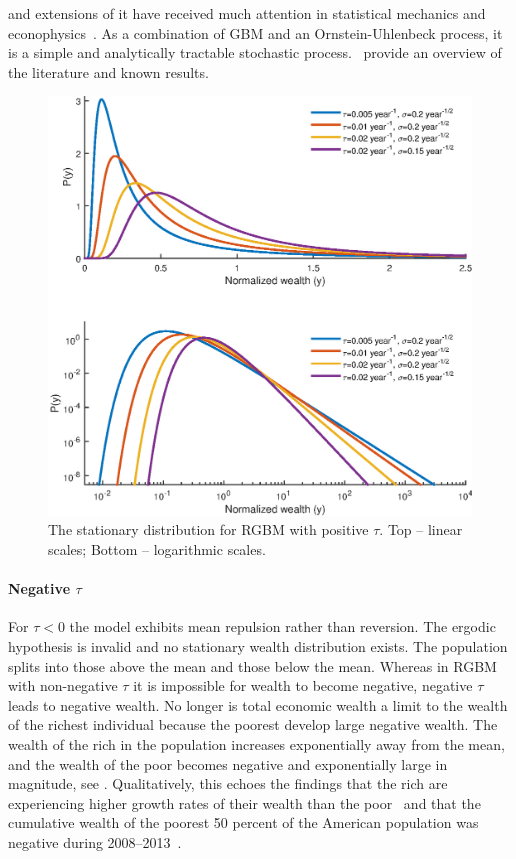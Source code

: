  and extensions of it have received much attention in statistical mechanics and econophysics~\cite{BouchaudMezard2000,Bouchaud2015}. As a combination of GBM and an Ornstein-Uhlenbeck process, it is a simple and analytically tractable stochastic process.~\cite{LiuSerota2016} provide an overview of the literature and known results.

\begin{figure}[!htb]
\centering
\includegraphics[width=1.0\textwidth] {./chapter_3/figs/dists.eps}
\caption{The stationary distribution for RGBM with positive $\tau$. Top -- linear scales; Bottom -- logarithmic scales.}
\end{figure}

\paragraph{Negative $\tau$}

For $\tau<0$ the model exhibits mean repulsion rather than reversion. The ergodic hypothesis is invalid and no stationary wealth distribution exists. The population splits into those above the mean and those below the mean. Whereas in RGBM with non-negative $\tau$ it is impossible for wealth to become negative, negative $\tau$ leads to negative wealth. No longer is total economic wealth a limit to the wealth of the richest individual because the poorest develop large negative wealth. The wealth of the rich in the population increases exponentially away from the mean, and the wealth of the poor becomes negative and exponentially large in magnitude, see . Qualitatively, this echoes the findings that the rich are experiencing higher growth rates of their wealth than the poor~\cite{Piketty2014,wolff2014household} and that the cumulative wealth of the poorest 50 percent of the American population was negative during 2008--2013~\cite{Rios20162013,WID2017}.

